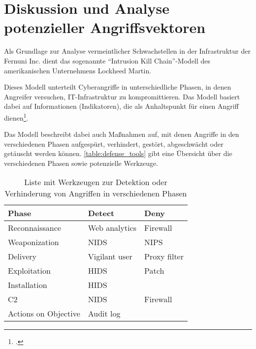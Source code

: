 \section{Diskussion und Analyse potenzieller Angriffsvektoren}

Als Grundlage zur Analyse vermeintlicher Schwachstellen in der Infrastruktur der Fernuni Inc. dient das sogenannte \enquote{Intrusion Kill Chain}-Modell des amerikanischen Unternehmens Lockheed Martin.

Dieses Modell unterteilt Cyberangriffe in unterschiedliche Phasen, in denen Angreifer versuchen, IT-Infrastruktur zu kompromittieren. Das Modell basiert dabei auf Informationen (Indikatoren), die als Anhaltspunkt für einen Angriff dienen\footcite[Vgl.][]{hutchinsIntelligenceDrivenComputerNetwork}.

Das Modell beschreibt dabei auch Maßnahmen auf, mit denen Angriffe in den verschiedenen Phasen aufgespürt, verhindert, gestört, abgeschwächt oder getäuscht werden können. \autoref{table:defense_tools} gibt eine Übersicht über die verschiedenen Phasen sowie potenzielle Werkzeuge.

\begin{table}[ht]
    \begin{center}
        \begin{tabular}{|l|l|l|}
            \hline
            Phase                & Detect        & Deny         \\ \hline
            Reconnaissance       & Web analytics & Firewall     \\ \hline
            Weaponization        & NIDS          & NIPS         \\ \hline
            Delivery             & Vigilant user & Proxy filter \\ \hline
            Exploitation         & HIDS          & Patch        \\ \hline
            Installation         & HIDS          &              \\ \hline
            C2                   & NIDS          & Firewall     \\ \hline
    Actions on Objective & Audit log     &              \\ \hline
        \end{tabular}
    \caption{Liste mit Werkzeugen zur Detektion oder Verhinderung von Angriffen in verschiedenen Phasen}
    \label{table:defense_tools}
    \end{center}
\end{table}

